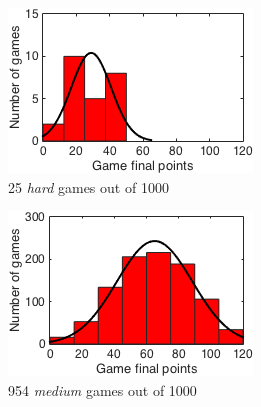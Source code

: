 \begin{figure}[h]
        \centering
        \begin{subfigure}[h]{0.32\textwidth}
                \includegraphics[width=\textwidth]{./img/appendix/histBhard}
                \caption{25 \emph{hard} games out of 1000}
                \label{app:histBhard}
        \end{subfigure}
        \begin{subfigure}[h]{0.32\textwidth}
                \includegraphics[width=\textwidth]{./img/appendix/histBmedium}
                \caption{954 \emph{medium} games out of 1000}
                \label{app:histBmedium}
        \end{subfigure}
        \begin{subfigure}[h]{0.32\textwidth}

\end{subfigure}
\end{figure}
